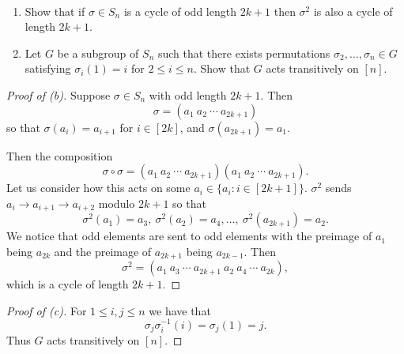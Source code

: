 \begin{prob}[2, Exam 2019]
    \  

    \begin{enumerate}
        \item[b)] Show that if $\sigma \in S_n$ is a cycle of 
            odd length $2k+1$ then $\sigma^2$ is also a cycle of 
            length $2k + 1$.
        \item[c)] Let $G$ be a subgroup of $S_n$ such that there 
            exists permutations $\sigma_2, \ldots, \sigma_n \in G$ 
            satisfying $\sigma_i(1) = i$ for $2 \leq i \leq n$. 
            Show that $G$ acts transitively on $[n]$.
    \end{enumerate}
\end{prob}
\begin{proof}[Proof of (b)]
    Suppose $\sigma \in S_n$ with odd length $2k+1$. Then 
    \[
        \sigma = (a_1 \ a_2 \ \cdots \ a_{2k+1})
    \]
    so that $\sigma(a_i) = a_{i+1}$ for $i \in [2k]$, and 
    $\sigma(a_{2k+1}) = a_1$.

    Then the composition 
    \[
        \sigma \circ \sigma 
        = (a_1 \ a_2 \ \cdots \ a_{2k+1})
        (a_1 \ a_2 \ \cdots \ a_{2k+1}).
    \]
    Let us consider how this acts on some $a_i \in 
    \{a_i : i \in [2k+1]\}$.
    $\sigma^2$ sends $a_i \to a_{i+1} \to a_{i+2}$ modulo 
    $2k+1$ so that 
    \[
        \sigma^2(a_1) = a_3, \ 
        \sigma^2(a_2) = a_4, 
        \ldots, \ 
        \sigma^2(a_{2k+1}) = a_2. 
    \]
    We notice that odd elements are sent to odd elements 
    with the preimage of $a_1$ being $a_{2k}$ and the preimage 
    of $a_{2k+1}$ being $a_{2k - 1}$. Then 
    \[
        \sigma^2 
        = (a_1 \ a_3 \ \cdots \ a_{2k+1} \ a_2 \ 
        a_4 \ \cdots \ a_{2k}), 
    \]
    which is a cycle of length $2k+1$.
\end{proof}
\begin{proof}[Proof of (c)]
    For $1 \leq i,j \leq n$ we have that 
    \[
        \sigma_j\sigma_i^{-1}(i) = \sigma_j(1) = j. 
    \]
    Thus $G$ acts transitively on $[n]$.
\end{proof}

